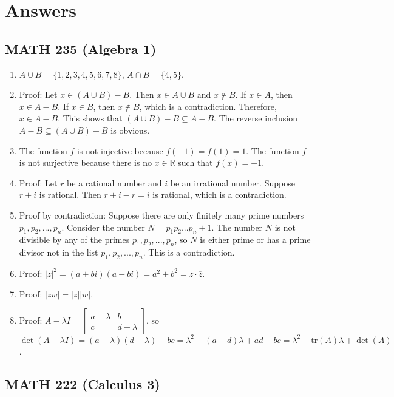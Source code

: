 \section*{Answers}

\subsection*{MATH 235 (Algebra 1)}

\begin{enumerate}
\item $A \cup B = \{1, 2, 3, 4, 5, 6, 7, 8\}$, $A \cap B = \{4, 5\}$.
\item Proof: Let $x \in (A \cup B) - B$. Then $x \in A \cup B$ and $x \notin B$. If $x \in A$, then $x \in A - B$. If $x \in B$, then $x \notin B$, which is a contradiction. Therefore, $x \in A - B$. This shows that $(A \cup B) - B \subseteq A - B$. The reverse inclusion $A - B \subseteq (A \cup B) - B$ is obvious.
\item The function $f$ is not injective because $f(-1) = f(1) = 1$. The function $f$ is not surjective because there is no $x \in \mathbb{R}$ such that $f(x) = -1$.
\item Proof: Let $r$ be a rational number and $i$ be an irrational number. Suppose $r + i$ is rational. Then $r + i - r = i$ is rational, which is a contradiction.
\item Proof by contradiction: Suppose there are only finitely many prime numbers $p_1, p_2, ..., p_n$. Consider the number $N = p_1p_2...p_n + 1$. The number $N$ is not divisible by any of the primes $p_1, p_2, ..., p_n$, so $N$ is either prime or has a prime divisor not in the list $p_1, p_2, ..., p_n$. This is a contradiction.
\item Proof: $|z|^2 = (a + bi)(a - bi) = a^2 + b^2 = z \cdot \overline{z}$.
\item Proof: $|zw| = |z||w|$.
\item Proof: $A - \lambda I = \begin{bmatrix} a - \lambda & b \\ c & d - \lambda \end{bmatrix}$, so $\det(A - \lambda I) = (a - \lambda)(d - \lambda) - bc = \lambda^2 - (a + d)\lambda + ad - bc = \lambda^2 - \text{tr}(A)\lambda + \det(A)$.
\end{enumerate}

\subsection*{MATH 222 (Calculus 3)}

